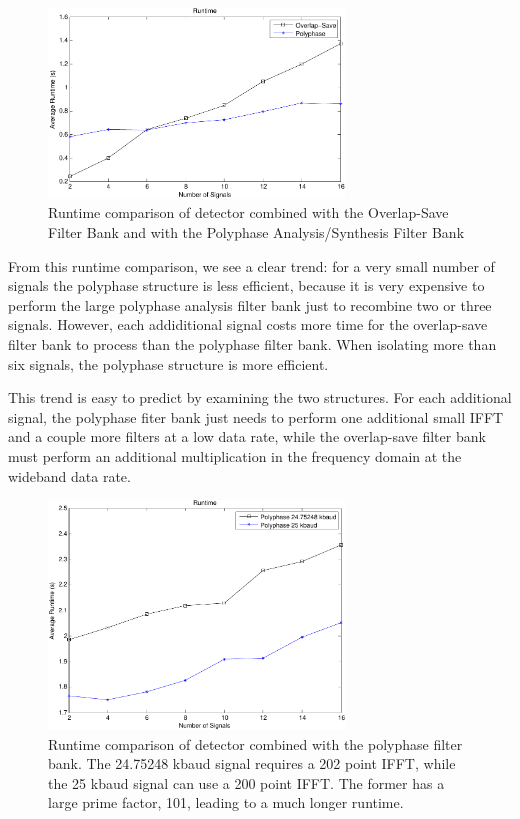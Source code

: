 \documentclass[12pt]{article}
\begin{document}
\begin{figure}[h!]
    \begin{center}
    \includegraphics[width=0.7\textwidth]{runtime_comparison_250}%
    \end{center}
    \caption{Runtime comparison of detector combined with the Overlap-Save
             Filter Bank and with the Polyphase Analysis/Synthesis Filter Bank}
    \label{fig:block_diagram}
\end{figure}

From this runtime comparison, we see a clear trend: for a very small number of
signals the polyphase structure is less efficient, because it is very 
expensive to perform the large polyphase analysis filter bank just to recombine
two or three signals. However, each addiditional signal costs more time for the 
overlap-save filter bank to process than the polyphase filter bank. When 
isolating more than six signals, the polyphase structure is more efficient.

This trend is easy to predict by examining the two structures. For each
additional signal, the polyphase fiter bank just needs to perform one
additional small IFFT and a couple more filters at a low data rate, while the
overlap-save filter bank must perform an additional multiplication in the
frequency domain at the wideband data rate.

\begin{figure}[h!]
    \begin{center}
    \includegraphics[width=0.7\textwidth]{fft_runtime_comparison}%
    \end{center}
    \caption{Runtime comparison of detector combined with the polyphase filter
             bank. The 24.75248 kbaud signal requires a 202 point IFFT, while 
             the 25 kbaud signal can use a 200 point IFFT. The former has a
             large prime factor, 101, leading to a much longer runtime.}
    \label{fig:block_diagram}
\end{figure}
\end{document}
